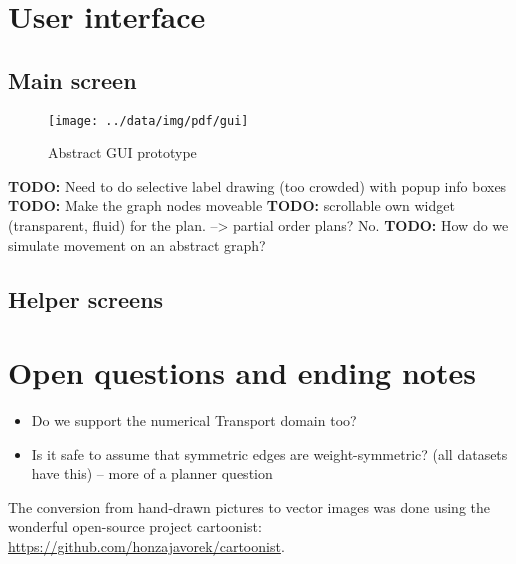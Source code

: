 \documentclass[10pt,a4paper,oneside]{article}
\newcommand{\TODO}[1]{{\textbf{TODO:} #1}} %
\begin{document}
\section{User interface}


\subsection{Main screen}

\FloatBarrier
\begin{figure}
        \centering
        \texttt{[image: ../data/img/pdf/gui]}
        \caption{Abstract GUI prototype}
        \label{fig:gui}
\end{figure}
\FloatBarrier

\TODO Need to do selective label drawing (too crowded) with popup info boxes
\TODO Make the graph nodes moveable
\TODO scrollable own widget (transparent, fluid) for the plan. --> partial order plans? No.
\TODO How do we simulate movement on an abstract graph?

\subsection{Helper screens}















\section{Open questions and ending notes}

\begin{itemize}
    \item Do we support the numerical Transport domain too?
    \item Is it safe to assume that symmetric edges are weight-symmetric? (all datasets have this) -- more of a planner question
\end{itemize}

The conversion from hand-drawn pictures to vector images was done using the wonderful
open-source project cartoonist: \url{https://github.com/honzajavorek/cartoonist}.

{
\footnotesize %

}
\end{document}
